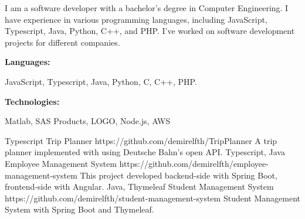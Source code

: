 \documentclass[9pt]{developercv} %
\begin{document}
\begin{minipage}[t]{0.46\textwidth}
	\vspace{-6pt}
 
        \begin{minipage}[t]{0.83\textwidth}
          I am a software developer with a bachelor's degree in Computer Engineering. I have experience in various programming languages, including JavaScript, Typescript, Java, Python, C++, and PHP. I've worked on software development projects for different companies.
        \end{minipage}
\end{minipage}
\hfill %
\begin{minipage}[t]{0.465\textwidth}
    \vspace{-6pt}
    
    \begin{minipage}[t]{0.2\textwidth}
        \textbf{Languages:}
    \end{minipage}
    \hfill
    \begin{minipage}[t]{0.73\textwidth}
      JavaScript, Typescript, Java, Python, C, C++, PHP.
    \end{minipage}
    \vspace{4mm}
    
    \begin{minipage}[t]{0.2\textwidth}
        \textbf{Technologies:}
    \end{minipage}
    \hfill
    \begin{minipage}[t]{0.73\textwidth}
      Matlab, SAS Products, LOGO, Node.js, AWS
    \end{minipage}
    
\end{minipage}

\begin{entrylist}
    \entry
		{Typescript}
		{Trip Planner}
		{https://github.com/demirelfth/TripPlanner}
		{ A trip planner implemented with using Deutsche Bahn's open API. }
    \entry
		{Typescript, Java}
		{Employee Management System}
		{https://github.com/demirelfth/employee-management-system}
		{ This project developed backend-side with Spring Boot, frontend-side with Angular. }
	\entry
		{Java, Thymeleaf}
		{Student Management System}
		{https://github.com/demirelfth/student-management-system}
		{ Student Management System with Spring Boot and Thymeleaf. }
\end{entrylist}
\end{document}
